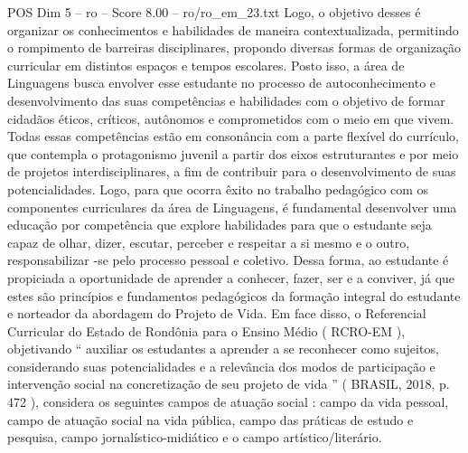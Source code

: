 \begin{textsample}{POS Dim 5 – ro – Score 8.00 – ro/ro\_em\_23.txt}
Logo, o objetivo desses é organizar os conhecimentos e habilidades de maneira contextualizada, permitindo o rompimento de barreiras disciplinares, propondo diversas formas de organização curricular em distintos espaços e tempos escolares.
Posto isso, a área de Linguagens busca envolver esse estudante no processo de autoconhecimento e desenvolvimento das suas competências e habilidades com o objetivo de formar cidadãos éticos, críticos, autônomos e comprometidos com o meio em que vivem.
Todas essas competências estão em consonância com a parte flexível do currículo, que contempla o protagonismo juvenil a partir dos eixos estruturantes e por meio de projetos interdisciplinares, a fim de contribuir para o desenvolvimento de suas potencialidades.
Logo, para que ocorra êxito no trabalho pedagógico com os componentes curriculares da área de Linguagens, é fundamental desenvolver uma educação por competência que explore habilidades para que o estudante seja capaz de olhar, dizer, escutar, perceber e respeitar a si mesmo e o outro, responsabilizar -se pelo processo pessoal e coletivo.
Dessa forma, ao estudante é propiciada a oportunidade de aprender a conhecer, fazer, ser e a conviver, já que estes são princípios e fundamentos pedagógicos da formação integral do estudante e norteador da abordagem do Projeto de Vida.
Em face disso, o Referencial Curricular do Estado de Rondônia para o Ensino Médio ( RCRO-EM ), objetivando “ auxiliar os estudantes a aprender a se reconhecer como sujeitos, considerando suas potencialidades e a relevância dos modos de participação e intervenção social na concretização de seu projeto de vida ” ( BRASIL, 2018, p. 472 ), considera os seguintes campos de atuação social : campo da vida pessoal, campo de atuação social na vida pública, campo das práticas de estudo e pesquisa, campo jornalístico-midiático e o campo artístico/literário.

\end{textsample}
